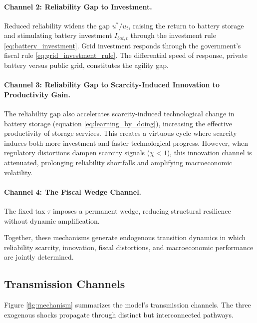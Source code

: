 	\paragraph{Channel 2: Reliability Gap to Investment.}
	Reduced reliability widens the gap $u^*/u_t$, raising the return to battery storage and stimulating battery investment $I_{bat,t}$ through the investment rule \eqref{eq:battery_investment}. Grid investment responds through the government's fiscal rule \eqref{eq:grid_investment_rule}. The differential speed of response, private battery versus public grid, constitutes the agility gap.
	
	\paragraph{Channel 3: Reliability Gap to Scarcity-Induced Innovation to Productivity Gain.}
	The reliability gap also accelerates scarcity-induced technological change in battery storage (equation \eqref{eq:learning_by_doing}), increasing the effective productivity of storage services. This creates a virtuous cycle where scarcity induces both more investment and faster technological progress. However, when regulatory distortions dampen scarcity signals ($\chi < 1$), this innovation channel is attenuated, prolonging reliability shortfalls and amplifying macroeconomic volatility.
	
	\paragraph{Channel 4: The Fiscal Wedge Channel.}
	The fixed tax $\tau$ imposes a permanent wedge, reducing structural resilience without dynamic amplification.

	Together, these mechanisms generate endogenous transition dynamics in which reliability scarcity, innovation, fiscal distortions, and macroeconomic performance are jointly determined.
	
	\subsection{Transmission Channels}
	
	Figure \ref{fig:mechanism} summarizes the model's transmission channels. The three exogenous shocks propagate through distinct but interconnected pathways.
	
